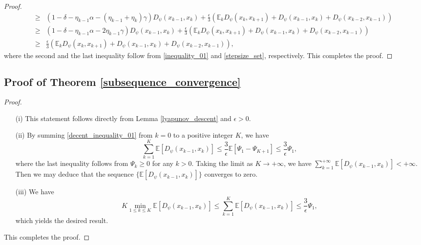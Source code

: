 \documentclass[letterpaper]{article} %
\begin{document}
\begin{proof}
\begin{align*}
			\ge&\left(1-\delta-\eta_{k-1}\alpha-(\eta_{k-1}+\eta_{k})\gamma\right)D_{\psi}(x_{k-1},x_{k})
			+\frac{\epsilon}{3}(\mathbb{E}_{k}D_{\psi}(x_{k},x_{k+1})+D_{\psi}(x_{k-1},x_{k})+D_{\psi}(x_{k-2},x_{k-1}))\\
			\ge&\left(1-\delta-\eta_{k-1}\alpha-2\eta_{k-1}\gamma\right)D_{\psi}(x_{k-1},x_{k})
			+\frac{\epsilon}{3}(\mathbb{E}_{k}D_{\psi}(x_{k},x_{k+1})+D_{\psi}(x_{k-1},x_{k})+D_{\psi}(x_{k-2},x_{k-1}))\\
			\ge&\frac{\epsilon}{3}(\mathbb{E}_{k}D_{\psi}(x_{k},x_{k+1})+D_{\psi}(x_{k-1},x_{k})+D_{\psi}(x_{k-2},x_{k-1})),
		\end{align*}
		where the second   and the last inequality follow from \eqref{inequality_01} and \eqref{stepsize_set}, respectively. This completes the proof. 
	\end{proof}
	\subsection{Proof of  Theorem \ref{subsequence_convergence}}
	\begin{proof}
		\begin{itemize}
			\item[(i)] This statement  follows   directly from Lemma \ref{lyapunov_descent} and $\epsilon>0$.
			\item[(ii)] By  summing \eqref{decent_inequality_01} from $k=0$ to a positive integer $K$, we have
			\[
			\sum_{k=1}^{K}\mathbb{E}[D_{\psi}(x_{k-1},x_{k})]\le \frac{3}{\epsilon}\mathbb{E}[\Psi_{1}-\Psi_{K+1}]\le \frac{3}{\epsilon}\Psi_{1},
			\]
			where the last inequality follows from $\Psi_{k}\ge 0$ for any $k>0$. Taking the limit as $K\rightarrow+\infty$, we have $\sum_{k=1}^{+\infty}\mathbb{E}[D_{\psi}(x_{k-1},x_{k})]<+\infty$. Then we may deduce that  the sequence $\{\mathbb{E}[ D_{\psi}(x_{k-1}, x_{k})]\}$ converges to zero. 
			\item[(iii)] We have
			\[
			K\min_{1\le k\le K}\mathbb{E}[D_{\psi}(x_{k-1},x_{k})]\le\sum_{k=1}^{K}\mathbb{E}[D_{\psi}(x_{k-1},x_{k})]\le\frac{3}{\epsilon}\Psi_{1},
			\]
			which yields the desired result. 
		\end{itemize}
		This completes the proof.
	\end{proof}
	
	
\end{document}
